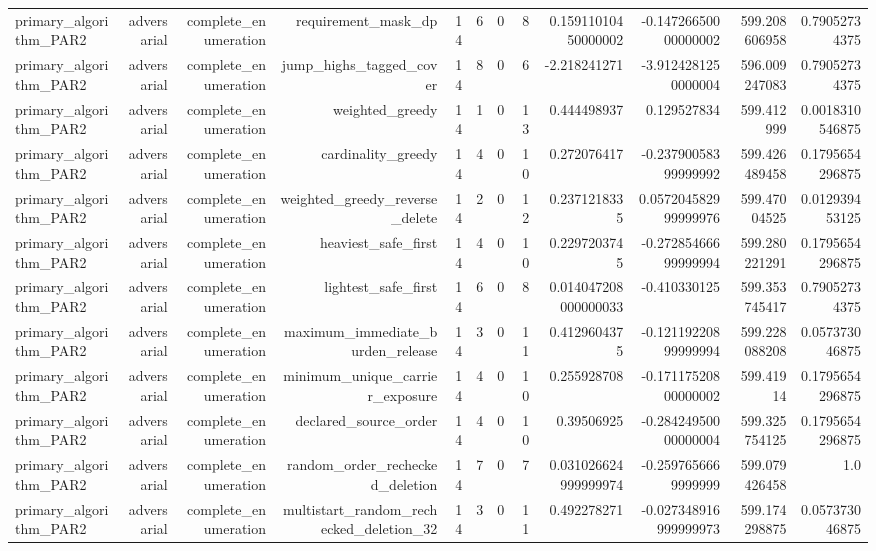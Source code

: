{\begin{longtable}{lrrrrrrrrrrr}
primary\_algorithm\_PAR2 & adversarial & complete\_enumeration & requirement\_mask\_dp & 14 & 6 & 0 & 8 & 0.15911010450000002 & -0.14726650000000002 & 599.208606958 & 0.79052734375 \\
primary\_algorithm\_PAR2 & adversarial & complete\_enumeration & jump\_highs\_tagged\_cover & 14 & 8 & 0 & 6 & -2.218241271 & -3.9124281250000004 & 596.009247083 & 0.79052734375 \\
primary\_algorithm\_PAR2 & adversarial & complete\_enumeration & weighted\_greedy & 14 & 1 & 0 & 13 & 0.444498937 & 0.129527834 & 599.412999 & 0.0018310546875 \\
primary\_algorithm\_PAR2 & adversarial & complete\_enumeration & cardinality\_greedy & 14 & 4 & 0 & 10 & 0.272076417 & -0.23790058399999992 & 599.426489458 & 0.1795654296875 \\
primary\_algorithm\_PAR2 & adversarial & complete\_enumeration & weighted\_greedy\_reverse\_delete & 14 & 2 & 0 & 12 & 0.2371218335 & 0.057204582999999976 & 599.47004525 & 0.012939453125 \\
primary\_algorithm\_PAR2 & adversarial & complete\_enumeration & heaviest\_safe\_first & 14 & 4 & 0 & 10 & 0.2297203745 & -0.27285466699999994 & 599.280221291 & 0.1795654296875 \\
primary\_algorithm\_PAR2 & adversarial & complete\_enumeration & lightest\_safe\_first & 14 & 6 & 0 & 8 & 0.014047208000000033 & -0.410330125 & 599.353745417 & 0.79052734375 \\
primary\_algorithm\_PAR2 & adversarial & complete\_enumeration & maximum\_immediate\_burden\_release & 14 & 3 & 0 & 11 & 0.4129604375 & -0.12119220899999994 & 599.228088208 & 0.057373046875 \\
primary\_algorithm\_PAR2 & adversarial & complete\_enumeration & minimum\_unique\_carrier\_exposure & 14 & 4 & 0 & 10 & 0.255928708 & -0.17117520800000002 & 599.41914 & 0.1795654296875 \\
primary\_algorithm\_PAR2 & adversarial & complete\_enumeration & declared\_source\_order & 14 & 4 & 0 & 10 & 0.39506925 & -0.28424950000000004 & 599.325754125 & 0.1795654296875 \\
primary\_algorithm\_PAR2 & adversarial & complete\_enumeration & random\_order\_rechecked\_deletion & 14 & 7 & 0 & 7 & 0.031026624999999974 & -0.2597656669999999 & 599.079426458 & 1.0 \\
primary\_algorithm\_PAR2 & adversarial & complete\_enumeration & multistart\_random\_rechecked\_deletion\_32 & 14 & 3 & 0 & 11 & 0.492278271 & -0.027348916999999973 & 599.174298875 & 0.057373046875 \\

\end{longtable}}
